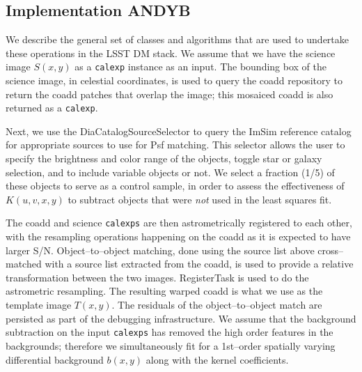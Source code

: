 \documentclass[prd, nofootinbib, floatfix, 11pt,tightenlines,times]{article}
\begin{document}

\subsection{Implementation {\bf ANDYB}}

We describe the general set of classes and algorithms that are used to
undertake these operations in the LSST DM stack.  We assume that we
have the science image $S(x,y)$ as a {\tt calexp} instance as an
input.  The bounding box of the science image, in celestial
coordinates, is used to query the coadd repository to return the coadd
patches that overlap the image; this mosaiced coadd is also returned
as a {\tt calexp}.

Next, we use the DiaCatalogSourceSelector to query the ImSim reference
catalog for appropriate sources to use for Psf matching.  This
selector allows the user to specify the brightness and color range of
the objects, toggle star or galaxy selection, and to include variable
objects or not.  We select a fraction (1/5) of these objects to serve
as a control sample, in order to assess the effectiveness of
$K(u,v,x,y)$ to subtract objects that were {\it not} used in the least
squares fit.

The coadd and science {\tt calexps} are then astrometrically
registered to each other, with the resampling operations happening on
the coadd as it is expected to have larger S/N.  Object--to--object
matching, done using the source list above cross--matched with a
source list extracted from the coadd, is used to provide a relative
transformation between the two images.  RegisterTask is used to do the
astrometric resampling.  The resulting warped coadd is what we use as
the template image $T(x,y)$.  The residuals of the object--to--object
match are persisted as part of the debugging infrastructure.  We
assume that the background subtraction on the input {\tt calexps} has
removed the high order features in the backgrounds; therefore we
simultaneously fit for a 1st--order spatially varying differential
background $b(x,y)$ along with the kernel coefficients.
\end{document}
